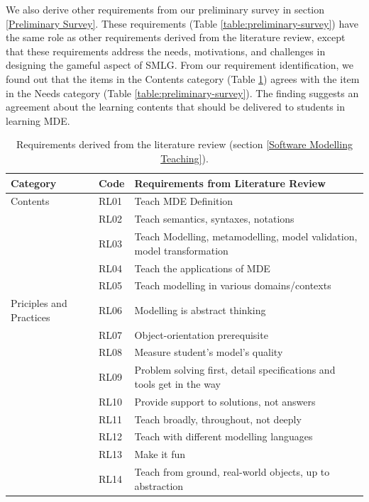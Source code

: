 \documentclass[12pt, a4paper]{report}
\begin{document}
{We also derive other requirements from our preliminary survey in section \ref{Preliminary Survey}. These requirements (Table \ref{table:preliminary-survey}) have the same role as other requirements derived from the literature review, except that these requirements address the needs, motivations, and challenges in designing the gameful aspect of SMLG. From our requirement identification, we found out that the items in the Contents category (Table \ref{table:requirements}) agrees with the item in the Needs category (Table \ref{table:preliminary-survey}). The finding suggests an agreement about the learning contents that should be delivered to students in learning MDE.

\begin{table}[ht]\caption{Requirements derived from the literature review (section \ref{Software Modelling Teaching}).}
\label{table:requirements}
\begin{center}
\begin{tabular}{ p{2cm}p{1cm}p{10cm} } 
\hline
Category & Code & Requirements from Literature Review \\
\hline
\multirow{1}{2cm}{Contents} 
& RL01 & Teach MDE Definition \\ 
& RL02 & Teach semantics, syntaxes, notations \\ 
& RL03 & Teach Modelling, metamodelling, model validation, model transformation\\
& RL04 & Teach the applications of MDE \\
& RL05 & Teach modelling in various domains/contexts \\

\hline
\multirow{1}{2cm}{Priciples and Practices} 
& RL06 & Modelling is abstract thinking \\ 
& RL07 & Object-orientation prerequisite \\
& RL08 & Measure student's model's quality \\
& RL09 & Problem solving first, detail specifications and tools get in the way \\
& RL10 & Provide support to solutions, not answers \\ 
& RL11 & Teach broadly, throughout, not deeply \\
& RL12 & Teach with different modelling languages \\ 
& RL13 & Make it fun \\ 
& RL14 & Teach from ground, real-world objects, up to abstraction \\ 


\end{tabular}
\end{center}
\end{table}}
\end{document}
